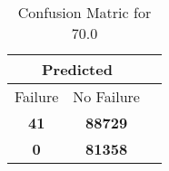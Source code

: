 \begin{table}[] 
\caption{Confusion Matric for 70.0} 
\label{Table: Prediction Accuracy-DMD70.0OnlySunEKF-ignoreReflection200.9EKF-top2-Reflection} 
\centering 
\begin{tabular} 
 {@{}ccc@{}} 
\toprule 
\multicolumn{2}{c}{\textbf{Predicted}}
 \\ \midrule 
\multicolumn{1}{|c|}{Failure} & 
\multicolumn{1}{c|}{No Failure}
 \\ \midrule 
\multicolumn{1}{|c|}{\color{green}\textbf{41}} & 
\multicolumn{1}{c|}{\color{green}\textbf{88729}}
 \\ \midrule 
\multicolumn{1}{|c|}{\color{red}\textbf{0}} & 
\multicolumn{1}{c|}{\color{red}\textbf{81358}}
 \\ \bottomrule 
\end{tabular} 
\end{table} 
